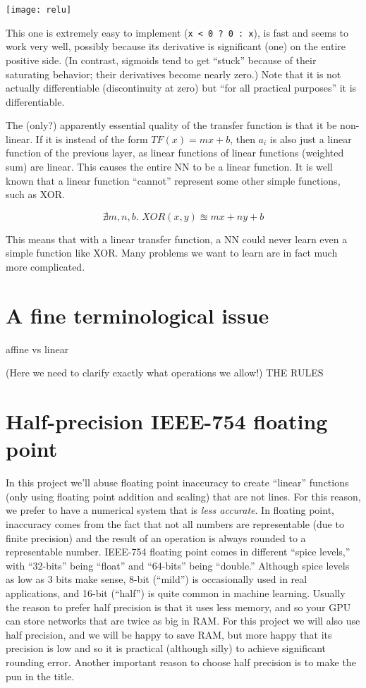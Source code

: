 \documentclass[twocolumn]{article}
\begin{document}
\begin{center}
\texttt{[image: relu]}
\end{center}

This one is extremely easy to implement (\verb+x < 0 ? 0 : x+), is fast
and seems to work very well, possibly because its derivative is
significant (one) on the entire positive side. (In contrast, sigmoids
tend to get ``stuck'' because of their saturating behavior; their
derivatives become nearly zero.) Note that it is not actually
differentiable (discontinuity at zero) but ``for all practical
purposes'' it is differentiable.

The (only?) apparently essential quality of the transfer function is
that it be non-linear. If it is instead of the form $TF(x) = mx + b$,
then $a_i$ is also just a linear function of the previous layer, as
linear functions of linear functions (weighted sum) are linear. This
causes the entire NN to be a linear function. It is well known that a
linear function ``cannot'' represent some other simple functions, such
as XOR.

$$\nexists m,n,b.\,\, XOR(x, y) \approxeq m x + n y + b$$

This means that with a linear transfer function, a NN could never
learn even a simple function like XOR. Many problems we want to learn
are in fact much more complicated.

\section{A fine terminological issue}
affine vs linear

(Here we need to clarify exactly what operations we allow!) THE RULES


\section{Half-precision IEEE-754 floating point}
In this project we'll abuse floating point inaccuracy to create
``linear'' functions (only using floating point addition and scaling)
that are not lines. For this reason, we prefer to have a numerical
system that is {\em less accurate}. In floating point, inaccuracy comes
from the fact that not all numbers are representable (due to finite
precision) and the result of an operation is always rounded to a
representable number. IEEE-754 floating point comes in different
``spice levels,'' with ``32-bits'' being ``float'' and ``64-bits''
being ``double.'' Although spice levels as low as 3 bits make
sense\cite{murphy2019nan}, 8-bit (``mild'') is occasionally used in
real applications, and 16-bit (``half'') is quite common in machine
learning. Usually the reason to prefer half precision is that it uses
less memory, and so your GPU can store networks that are twice as big
in RAM. For this project we will also use half precision, and we will
be happy to save RAM, but more happy that its precision is low and so
it is practical (although silly) to achieve significant rounding
error. Another important reason to choose half precision is to make
the pun in the title.
\end{document}
